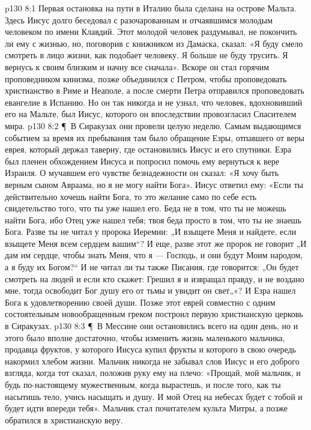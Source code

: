 \vs p130 8:1 Первая остановка на пути в Италию была сделана на острове Мальта. Здесь Иисус долго беседовал с разочарованным и отчаявшимся молодым человеком по имени Клавдий. Этот молодой человек раздумывал, не покончить ли ему с жизнью, но, поговорив с книжником из Дамаска, сказал: «Я буду смело смотреть в лицо жизни, как подобает человеку. Я больше не буду трусить. Я вернусь к своим близким и начну все сначала». Вскоре он стал горячим проповедником кинизма, позже объединился с Петром, чтобы проповедовать христианство в Риме и Неаполе, а после смерти Петра отправился проповедовать евангелие в Испанию. Но он так никогда и не узнал, что человек, вдохновивший его на Мальте, был Иисус, которого он впоследствии провозгласил Спасителем мира.
\vs p130 8:2 \P\ В Сиракузах они провели целую неделю. Самым выдающимся событием за время их пребывания там было обращение Езры, отпавшего от веры еврея, который держал таверну, где остановились Иисус и его спутники. Езра был пленен обхождением Иисуса и попросил помочь ему вернуться к вере Израиля. О мучавшем его чувстве безнадежности он сказал: «Я хочу быть верным сыном Авраама, но я не могу найти Бога». Иисус ответил ему: «Если ты действительно хочешь найти Бога, то это желание само по себе есть свидетельство того, что ты уже нашел его. Беда не в том, что ты не можешь найти Бога, ибо Отец уже нашел тебя; твоя беда просто в том, что ты не знаешь Бога. Разве ты не читал у пророка Иеремии: „И взыщете Меня и найдете, если взыщете Меня всем сердцем вашим“? И еще, разве этот же пророк не говорит „И дам им сердце, чтобы знать Меня, что я --- Господь, и они будут Моим народом, а я буду их Богом?“ И не читал ли ты также Писания, где говорится: „Он будет смотреть на людей и если кто скажет: Грешил я и извращал правду, и не воздано мне, тогда освободит Бог душу его от тьмы и увидит он свет„«? И Езра нашел Бога к удовлетворению своей души. Позже этот еврей совместно с одним состоятельным новообращенным греком построил первую христианскую церковь в Сиракузах.
\vs p130 8:3 \P\ В Мессине они остановились всего на один день, но и этого было вполне достаточно, чтобы изменить жизнь маленького мальчика, продавца фруктов, у которого Иисуса купил фрукты и которого в свою очередь накормил хлебом жизни. Мальчик никогда не забывал слов Иисус и его доброго взгляда, когда тот сказал, положив руку ему на плечо: «Прощай, мой мальчик, и будь по\hyp{}настоящему мужественным, когда вырастешь, и после того, как ты насытишь тело, учись насыщать и душу. И мой Отец на небесах будет с тобой и будет идти впереди тебя». Мальчик стал почитателем культа Митры, а позже обратился в христианскую веру.

